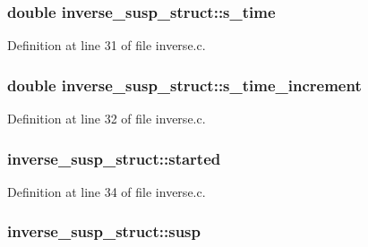 \subsubsection[{\texorpdfstring{s\+\_\+time}{s_time}}]{\setlength{\rightskip}{0pt plus 5cm}double inverse\+\_\+susp\+\_\+struct\+::s\+\_\+time}\hypertarget{structinverse__susp__struct_a5c331c9531e0a3cad7806d42eccd98d4}{}\label{structinverse__susp__struct_a5c331c9531e0a3cad7806d42eccd98d4}


Definition at line 31 of file inverse.\+c.

\subsubsection[{\texorpdfstring{s\+\_\+time\+\_\+increment}{s_time_increment}}]{\setlength{\rightskip}{0pt plus 5cm}double inverse\+\_\+susp\+\_\+struct\+::s\+\_\+time\+\_\+increment}\hypertarget{structinverse__susp__struct_ac369d11a35bbed9919216c35ddb4af91}{}\label{structinverse__susp__struct_ac369d11a35bbed9919216c35ddb4af91}


Definition at line 32 of file inverse.\+c.

\subsubsection[{\texorpdfstring{started}{started}}]{ inverse\+\_\+susp\+\_\+struct\+::started}\hypertarget{structinverse__susp__struct_a73ece63594332b6cacb03dcead97e50b}{}\label{structinverse__susp__struct_a73ece63594332b6cacb03dcead97e50b}


Definition at line 34 of file inverse.\+c.

\subsubsection[{\texorpdfstring{susp}{susp}}]{ inverse\+\_\+susp\+\_\+struct\+::susp}\hypertarget{structinverse__susp__struct_a3e4d8a81ba9aeb75c5798f433b7872b9}{}\label{structinverse__susp__struct_a3e4d8a81ba9aeb75c5798f433b7872b9}


